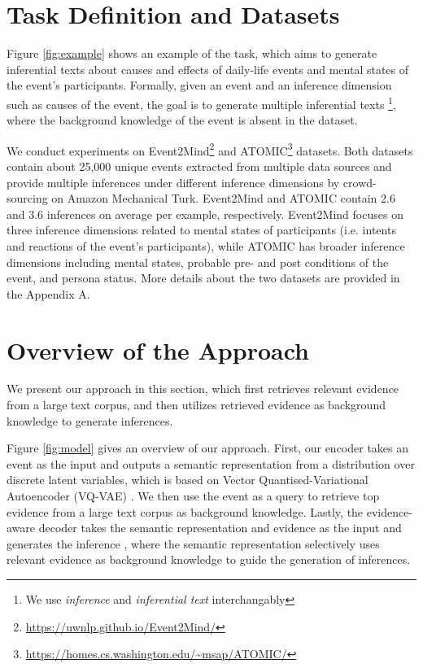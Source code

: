 \documentclass[11pt,a4paper]{article}
\begin{document}
\section{Task Definition and Datasets}
Figure \ref{fig:example} shows an example of the task, which aims to generate inferential texts about causes and effects of daily-life events and mental states of the event’s participants. Formally, given an event  and an inference dimension  such as causes of the event, the goal is to generate multiple inferential texts \footnote{We use \textit{inference} and \textit{inferential text} interchangably}, where the background knowledge of the event is absent in the dataset.

We conduct experiments on Event2Mind\footnote{\url{https://uwnlp.github.io/Event2Mind/}} \cite{rashkin2018event2mind} and ATOMIC\footnote{\url{https://homes.cs.washington.edu/~msap/ATOMIC/}} \cite{sap2019atomic} datasets.
Both datasets contain about 25,000 unique events extracted from multiple data sources and provide multiple inferences under different inference dimensions by crowd-sourcing on Amazon Mechanical Turk. Event2Mind and ATOMIC contain 2.6 and 3.6 inferences on average per example, respectively. Event2Mind focuses on three inference dimensions related to mental states of participants (i.e. intents and reactions of the event’s participants), while ATOMIC has broader inference dimensions including mental states, probable pre- and post conditions of the event, and persona status.
More details about the two datasets are provided in the Appendix A. 




\section{Overview of the Approach}
We present our approach in this section, which first retrieves relevant evidence from a large text corpus, and then utilizes retrieved evidence as background knowledge to generate inferences.

Figure \ref{fig:model} gives an overview of our approach. 
First, our encoder takes an event as the input and outputs a semantic representation  from a distribution over discrete latent variables, which is based on Vector Quantised-Variational Autoencoder (VQ-VAE) \cite{van2017neural}.
We then use the event as a query to retrieve top  evidence from a large text corpus as background knowledge.
Lastly, the evidence-aware decoder takes the semantic representation and evidence as the input and generates the inference , where the semantic representation selectively uses relevant evidence as background knowledge to guide the generation of inferences. 
\end{document}
